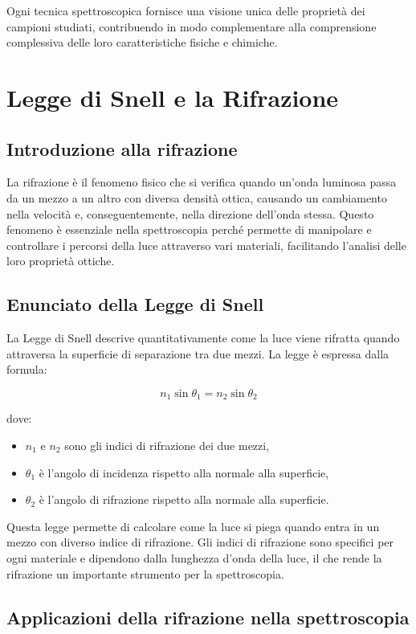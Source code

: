\documentclass[12pt,a4paper]{report}
\begin{document}
Ogni tecnica spettroscopica fornisce una visione unica delle proprietà dei campioni studiati, contribuendo in modo complementare alla comprensione complessiva delle loro caratteristiche fisiche e chimiche.

\section{Legge di Snell e la Rifrazione}

\subsection{Introduzione alla rifrazione}

La rifrazione è il fenomeno fisico che si verifica quando un'onda luminosa passa da un mezzo a un altro con diversa densità ottica, causando un cambiamento nella velocità e, conseguentemente, nella direzione dell'onda stessa. Questo fenomeno è essenziale nella spettroscopia perché permette di manipolare e controllare i percorsi della luce attraverso vari materiali, facilitando l'analisi delle loro proprietà ottiche.

\subsection{Enunciato della Legge di Snell}

La Legge di Snell descrive quantitativamente come la luce viene rifratta quando attraversa la superficie di separazione tra due mezzi. La legge è espressa dalla formula:

\[ n_1 \sin \theta_1 = n_2 \sin \theta_2 \]

dove:
\begin{itemize}
\item \( n_1 \) e \( n_2 \) sono gli indici di rifrazione dei due mezzi,
\item \( \theta_1 \) è l'angolo di incidenza rispetto alla normale alla superficie,
\item \( \theta_2 \) è l'angolo di rifrazione rispetto alla normale alla superficie.
\end{itemize}

Questa legge permette di calcolare come la luce si piega quando entra in un mezzo con diverso indice di rifrazione. Gli indici di rifrazione sono specifici per ogni materiale e dipendono dalla lunghezza d'onda della luce, il che rende la rifrazione un importante strumento per la spettroscopia.

\subsection{Applicazioni della rifrazione nella spettroscopia}
\end{document}
